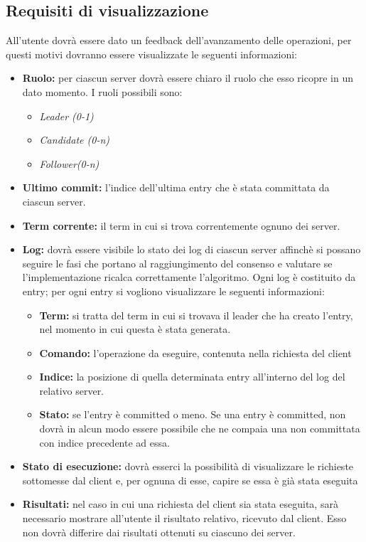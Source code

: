 	\subsection{Requisiti di visualizzazione}
	All'utente dovrà essere dato un feedback dell'avanzamento delle operazioni, per questi motivi dovranno essere visualizzate le seguenti informazioni: 
		\begin{itemize}
			\item \textbf{Ruolo:} per ciascun server dovrà essere chiaro il ruolo che esso ricopre in un dato momento. I ruoli possibili sono:
				\begin{itemize}
					\item \emph{Leader (0-1)}
					\item \emph{Candidate (0-n)}
					\item \emph{Follower(0-n)}
				\end{itemize}
			\item \textbf{Ultimo commit:} l'indice dell'ultima entry che è stata committata da ciascun server.
			\item \textbf{Term corrente:} il term in cui si trova correntemente ognuno dei server.
			\item \textbf{Log:} dovrà essere visibile lo stato dei log di ciascun server affinchè si possano seguire le fasi che portano al raggiungimento del consenso e valutare se l'implementazione ricalca correttamente l'algoritmo. Ogni log è costituito da entry; per ogni entry si vogliono visualizzare le seguenti informazioni:
				\begin{itemize}
					\item \textbf{Term:} si tratta del term in cui si trovava il leader che ha creato l'entry, nel momento in cui questa è stata generata. 
					\item \textbf{Comando:} l'operazione da eseguire, contenuta nella richiesta del client 
					\item \textbf{Indice:} la posizione di quella determinata entry all'interno del log del relativo server.
					\item \textbf{Stato:} se l'entry è committed o meno. Se una entry è committed, non dovrà in alcun modo essere possibile che ne compaia una non committata con indice precedente ad essa.
				\end{itemize} 
			\item \textbf{Stato di esecuzione:} dovrà esserci la possibilità di visualizzare le richieste sottomesse dal client e, per ognuna di esse, capire se essa è già stata eseguita
			\item \textbf{Risultati:} nel caso in cui una richiesta del client sia stata eseguita, sarà necessario mostrare all'utente il risultato relativo, ricevuto dal client. Esso non dovrà differire dai risultati ottenuti su ciascuno dei server.
		\end{itemize}

